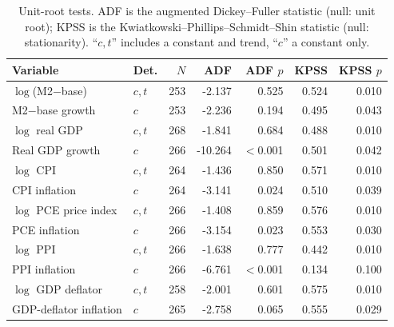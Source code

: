 \begin{table}[htbp]
\centering
\setlength{\belowcaptionskip}{8pt}
\small

\caption{Unit-root tests. ADF is the augmented Dickey--Fuller statistic (null: unit root); KPSS is the Kwiatkowski--Phillips--Schmidt--Shin statistic (null: stationarity). ``$c,t$'' includes a constant and trend, ``$c$'' a constant only.}
\label{tab:unitroots}
\begin{tabular}{llrrrrr}
\toprule
Variable & Det. & $N$ & ADF & ADF $p$ & KPSS & KPSS $p$ \\
\midrule
$\log$(M2$-$base) & $c,t$ & 253 & -2.137 & 0.525 & 0.524 & 0.010 \\
M2$-$base growth & $c$ & 253 & -2.236 & 0.194 & 0.495 & 0.043 \\
$\log$ real GDP & $c,t$ & 268 & -1.841 & 0.684 & 0.488 & 0.010 \\
Real GDP growth & $c$ & 266 & -10.264 & $<$0.001 & 0.501 & 0.042 \\
$\log$ CPI & $c,t$ & 264 & -1.436 & 0.850 & 0.571 & 0.010 \\
CPI inflation & $c$ & 264 & -3.141 & 0.024 & 0.510 & 0.039 \\
$\log$ PCE price index & $c,t$ & 266 & -1.408 & 0.859 & 0.576 & 0.010 \\
PCE inflation & $c$ & 266 & -3.154 & 0.023 & 0.553 & 0.030 \\
$\log$ PPI & $c,t$ & 266 & -1.638 & 0.777 & 0.442 & 0.010 \\
PPI inflation & $c$ & 266 & -6.761 & $<$0.001 & 0.134 & 0.100 \\
$\log$ GDP deflator & $c,t$ & 258 & -2.001 & 0.601 & 0.575 & 0.010 \\
GDP-deflator inflation & $c$ & 265 & -2.758 & 0.065 & 0.555 & 0.029 \\
\bottomrule
\end{tabular}
\end{table}

